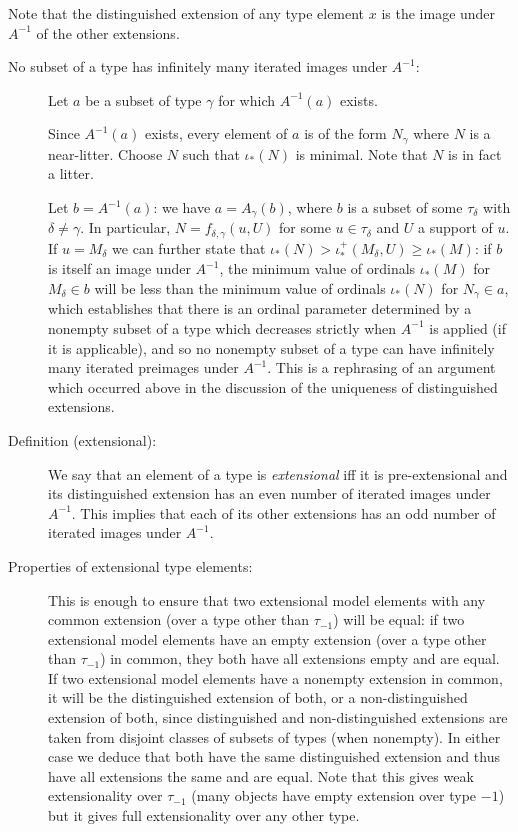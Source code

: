 \documentclass[112pt]{article}
\begin{document}
Note that the distinguished extension of any type element $x$ is the image under $A^{-1}$ of the other extensions.

\begin{description}

\item[No subset of a type has infinitely many iterated images under $A^{-1}$:]  Let $a$ be a subset of type $\gamma$ for which $A^{-1}(a)$ exists.  

Since $A^{-1}(a)$ exists, every element of $a$ is of the form $N_\gamma$ where $N$ is a near-litter.  Choose $N$ such that $\iota_*(N)$ is minimal.  Note that $N$ is in fact a litter.

Let $b = A^{-1}(a)$:  we have $a = A_\gamma(b)$, where $b$ is a subset of some $\tau_\delta$ with $\delta \neq \gamma$.  In particular, $N = f_{\delta,\gamma}(u,U)$ for
some $u \in \tau_\delta$ and $U$ a support of $u$.  If $u=M_\delta$ we can further state that $\iota_*(N) > \iota^+_*(M_\delta,U) \geq \iota_*(M)$:  if $b$ is itself an image under $A^{-1}$, the minimum value of ordinals $\iota_*(M)$ for $M_\delta \in b$ will be less than the minimum value of ordinals $\iota_*(N)$ for $N_\gamma\in a$, which establishes that there is an ordinal parameter determined by a nonempty subset of a type which decreases strictly when $A^{-1}$ is applied (if it is applicable), and so no nonempty subset of a type
can have infinitely many iterated preimages under $A^{-1}$.  This is a rephrasing of an argument which occurred above in the discussion of the uniqueness of distinguished extensions.



\item[Definition (extensional):]  We say that an element of a type is {\em extensional\/} iff
it is pre-extensional and its distinguished extension has an even number of iterated images under $A^{-1}$.
This implies that each of its other extensions has an odd number of iterated images under $A^{-1}$. 

\item[Properties of extensional type elements:]   This is enough to ensure that two extensional model elements with any common extension (over a type other than $\tau_{-1}$) will be equal:  if two extensional model elements have an empty extension (over a type other than $\tau_{-1}$) in common, they both have all extensions empty and are equal.  If two extensional model elements have a nonempty extension in common, it will be the distinguished extension of both, or a non-distinguished extension of both, since distinguished and non-distinguished extensions are taken from disjoint classes of subsets of types (when nonempty).
In either case we deduce that both have the same distinguished extension and thus have all extensions the same and are equal.  Note that this gives weak extensionality over $\tau_{-1}$ (many objects have empty extension over type $-1$) but it gives full extensionality over any other type.


\end{description}
\end{document}

